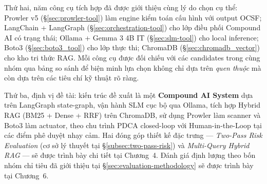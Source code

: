 Thứ hai, năm công cụ tích hợp đã được giới thiệu cùng lý do chọn cụ thể: Prowler v5 (§\ref{sec:prowler-tool}) làm engine kiểm toán cấu hình với output OCSF; LangChain + LangGraph (§\ref{sec:orchestration-tool}) cho lớp điều phối Compound AI có trạng thái; Ollama + Gemma 3 4B IT (§\ref{sec:slm-tool}) cho local inference; Boto3 (§\ref{sec:boto3_tool}) cho lớp thực thi; ChromaDB (§\ref{sec:chromadb_vector}) cho kho tri thức RAG. Mỗi công cụ được đối chiếu với các candidates trong cùng nhóm qua bảng so sánh để biện minh lựa chọn không chỉ dựa trên \textit{quen thuộc} mà còn dựa trên các tiêu chí kỹ thuật rõ ràng.

Thứ ba, định vị đề tài: kiến trúc đề xuất là một \textbf{Compound AI System} dựa trên LangGraph state-graph, vận hành SLM cục bộ qua Ollama, tích hợp Hybrid RAG (BM25 + Dense + RRF) trên ChromaDB, sử dụng Prowler làm scanner và Boto3 làm actuator, theo chu trình PDCA closed-loop với Human-in-the-Loop tại các điểm phê duyệt nhạy cảm. Hai đóng góp thiết kế đặc trưng --- \textit{Two-Pass Risk Evaluation} (cơ sở lý thuyết tại §\ref{subsec:two-pass-risk}) và \textit{Multi-Query Hybrid RAG} --- sẽ được trình bày chi tiết tại Chương~4. Đánh giá định lượng theo bốn nhóm chỉ tiêu đã giới thiệu tại §\ref{sec:evaluation-methodology} sẽ được trình bày tại Chương~6.

